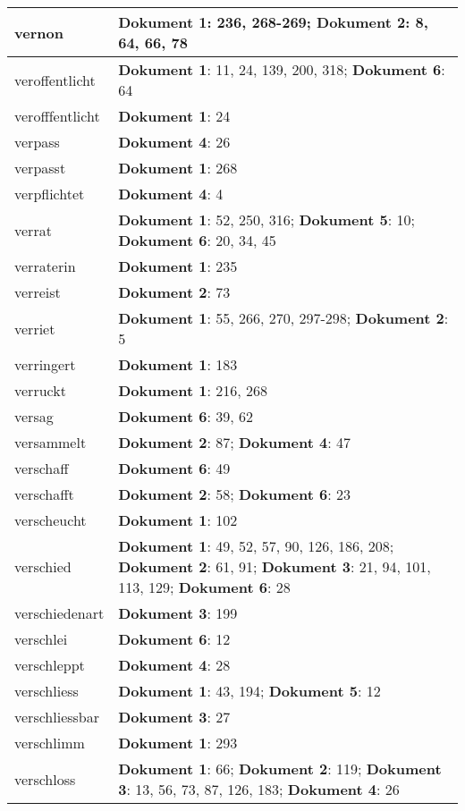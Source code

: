 \documentclass[a5paper]{article}
\begin{document}
\begin{longtable}[l]{|l|p{3in}|}
\hline
vernon & \textbf{Dokument 1}: 236, 268-269; \textbf{Dokument 2}: 8, 64, 66, 78 \\
\hline
veroffentlicht & \textbf{Dokument 1}: 11, 24, 139, 200, 318; \textbf{Dokument 6}: 64 \\
\hline
verofffentlicht & \textbf{Dokument 1}: 24 \\
\hline
verpass & \textbf{Dokument 4}: 26 \\
\hline
verpasst & \textbf{Dokument 1}: 268 \\
\hline
verpflichtet & \textbf{Dokument 4}: 4 \\
\hline
verrat & \textbf{Dokument 1}: 52, 250, 316; \textbf{Dokument 5}: 10; \textbf{Dokument 6}: 20, 34, 45 \\
\hline
verraterin & \textbf{Dokument 1}: 235 \\
\hline
verreist & \textbf{Dokument 2}: 73 \\
\hline
verriet & \textbf{Dokument 1}: 55, 266, 270, 297-298; \textbf{Dokument 2}: 5 \\
\hline
verringert & \textbf{Dokument 1}: 183 \\
\hline
verruckt & \textbf{Dokument 1}: 216, 268 \\
\hline
versag & \textbf{Dokument 6}: 39, 62 \\
\hline
versammelt & \textbf{Dokument 2}: 87; \textbf{Dokument 4}: 47 \\
\hline
verschaff & \textbf{Dokument 6}: 49 \\
\hline
verschafft & \textbf{Dokument 2}: 58; \textbf{Dokument 6}: 23 \\
\hline
verscheucht & \textbf{Dokument 1}: 102 \\
\hline
verschied & \textbf{Dokument 1}: 49, 52, 57, 90, 126, 186, 208; \textbf{Dokument 2}: 61, 91; \textbf{Dokument 3}: 21, 94, 101, 113, 129; \textbf{Dokument 6}: 28 \\
\hline
verschiedenart & \textbf{Dokument 3}: 199 \\
\hline
verschlei & \textbf{Dokument 6}: 12 \\
\hline
verschleppt & \textbf{Dokument 4}: 28 \\
\hline
verschliess & \textbf{Dokument 1}: 43, 194; \textbf{Dokument 5}: 12 \\
\hline
verschliessbar & \textbf{Dokument 3}: 27 \\
\hline
verschlimm & \textbf{Dokument 1}: 293 \\
\hline
verschloss & \textbf{Dokument 1}: 66; \textbf{Dokument 2}: 119; \textbf{Dokument 3}: 13, 56, 73, 87, 126, 183; \textbf{Dokument 4}: 26 \\

\end{longtable}
\end{document}

